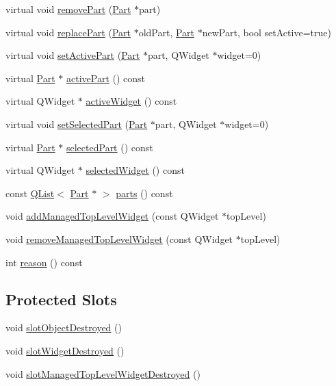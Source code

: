 \begin{DoxyCompactItemize}
\item 
virtual void \hyperlink{classKParts_1_1PartManager_a0b24449299b70c53b623f22d6a0ea0db}{remove\+Part} (\hyperlink{classKParts_1_1Part}{Part} $\ast$part)
\item 
virtual void \hyperlink{classKParts_1_1PartManager_af8bffaa758fc5c4009d3d1d9e37cad82}{replace\+Part} (\hyperlink{classKParts_1_1Part}{Part} $\ast$old\+Part, \hyperlink{classKParts_1_1Part}{Part} $\ast$new\+Part, bool set\+Active=true)
\item 
virtual void \hyperlink{classKParts_1_1PartManager_af7b5c8d0002fdd97805e2cd6e5edf953}{set\+Active\+Part} (\hyperlink{classKParts_1_1Part}{Part} $\ast$part, Q\+Widget $\ast$widget=0)
\item 
virtual \hyperlink{classKParts_1_1Part}{Part} $\ast$ \hyperlink{classKParts_1_1PartManager_a5d2bd122e406ce153cc28135e2da78de}{active\+Part} () const 
\item 
virtual Q\+Widget $\ast$ \hyperlink{classKParts_1_1PartManager_aa2b5518384d745561b968764ca7ca2b1}{active\+Widget} () const 
\item 
virtual void \hyperlink{classKParts_1_1PartManager_a1df9580cc201575d32c3203296678dbb}{set\+Selected\+Part} (\hyperlink{classKParts_1_1Part}{Part} $\ast$part, Q\+Widget $\ast$widget=0)
\item 
virtual \hyperlink{classKParts_1_1Part}{Part} $\ast$ \hyperlink{classKParts_1_1PartManager_a706102e108c2683b9e38782545e0a817}{selected\+Part} () const 
\item 
virtual Q\+Widget $\ast$ \hyperlink{classKParts_1_1PartManager_a92a6bf8063ca8b38728199b49983637c}{selected\+Widget} () const 
\item 
const \hyperlink{classQList}{Q\+List}$<$ \hyperlink{classKParts_1_1Part}{Part} $\ast$ $>$ \hyperlink{classKParts_1_1PartManager_a9d5edb8bc36564f884a63f54a50ec787}{parts} () const 
\item 
void \hyperlink{classKParts_1_1PartManager_abe98bb196d2d7d6e154f554dd32e5ae0}{add\+Managed\+Top\+Level\+Widget} (const Q\+Widget $\ast$top\+Level)
\item 
void \hyperlink{classKParts_1_1PartManager_a4e4efe62ab0feb8ecd7c2463e179a77d}{remove\+Managed\+Top\+Level\+Widget} (const Q\+Widget $\ast$top\+Level)
\item 
int \hyperlink{classKParts_1_1PartManager_a35ac9816c27e769deeed841ada32c36d}{reason} () const 
\end{DoxyCompactItemize}
\subsection*{Protected Slots}
\begin{DoxyCompactItemize}
\item 
void \hyperlink{classKParts_1_1PartManager_a302a72cbb49af3e0a812ce5e9225c365}{slot\+Object\+Destroyed} ()
\item 
void \hyperlink{classKParts_1_1PartManager_ae4126097ecd82d223c316a2b2bb3ef4f}{slot\+Widget\+Destroyed} ()
\item 
void \hyperlink{classKParts_1_1PartManager_a74ca60268029a118ee48bb8d84b729e7}{slot\+Managed\+Top\+Level\+Widget\+Destroyed} ()
\end{DoxyCompactItemize}
